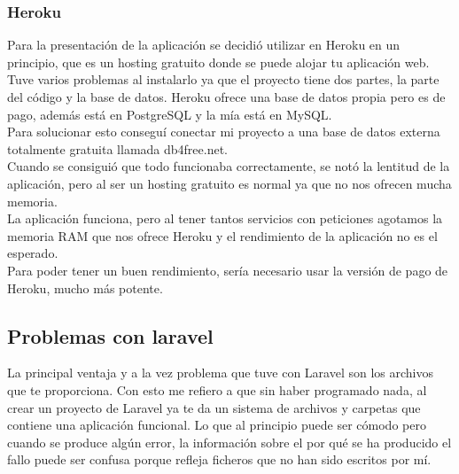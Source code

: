 \subsubsection{Heroku}
Para la presentación de la aplicación se decidió utilizar en Heroku en un principio, que es un hosting gratuito donde se puede alojar tu aplicación web. Tuve varios problemas al instalarlo ya que el proyecto tiene dos partes, la parte del código y la base de datos. Heroku ofrece una base de datos propia pero es de pago, además está en PostgreSQL y la mía está en MySQL.\\
Para solucionar esto conseguí conectar mi proyecto a una base de datos externa totalmente gratuita llamada db4free.net.\\
Cuando se consiguió que todo funcionaba correctamente, se notó la lentitud de la aplicación, pero al ser un hosting gratuito
es normal ya que no nos ofrecen mucha memoria.\\
La aplicación funciona, pero al tener tantos servicios con peticiones agotamos la memoria RAM que nos ofrece Heroku y el rendimiento de la aplicación no es el esperado.\\
Para poder tener un buen rendimiento, sería necesario usar la versión de pago de Heroku, mucho más potente.
\subsection{Problemas con laravel}
La principal ventaja y a la vez problema que tuve con Laravel son los archivos que te proporciona. Con esto me refiero a que sin haber programado nada, al crear un proyecto de Laravel ya te da un sistema de archivos y carpetas que contiene una aplicación funcional. Lo que al principio puede ser cómodo pero cuando se produce algún error, la información sobre el por qué se ha producido el fallo puede ser confusa porque refleja ficheros que no han sido escritos por mí.





